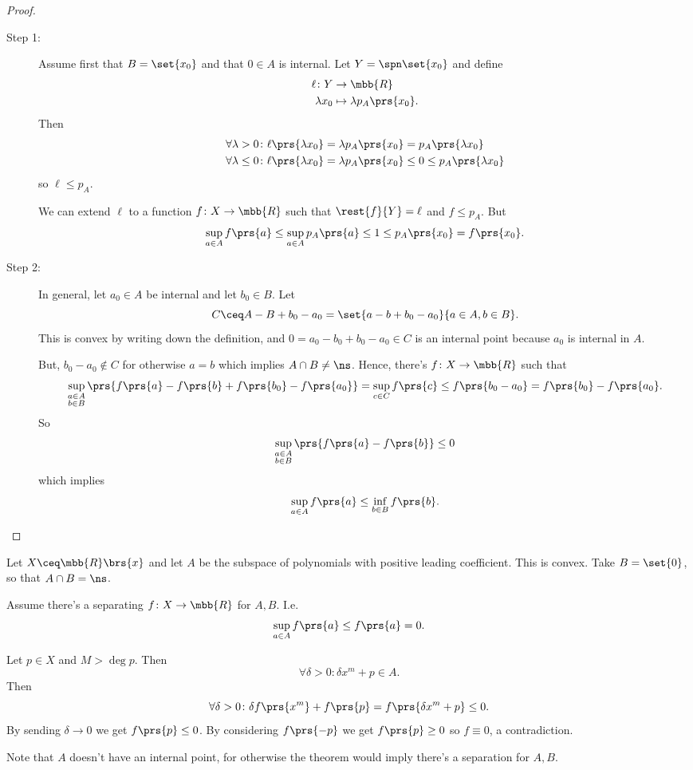 \documentclass[10pt, twoside]{book}
\begin{document}
\begin{proof}
\begin{description}
\item[Step 1:]
Assume first that $B = \set{x_0}$ and that $0 \in A$ is internal.
Let $Y = \spn\set{x_0}$ and define
\begin{align*}
\ell \colon Y &\to \mbb{R} \\
\lambda x_0 &\mapsto \lambda p_A\prs{x_0} \text{.}
\end{align*}
Then
\begin{align*}
\forall \lambda >0 \colon \ell\prs{\lambda x_0} &= \lambda p_A\prs{x_0} = p_A\prs{\lambda x_0} \\
\forall \lambda \leq 0 \colon \ell\prs{\lambda x_0} &= \lambda p_A\prs{x_0} \leq 0 \leq p_A\prs{\lambda x_0}
\end{align*}
so $\ell \leq p_A$.

We can extend $\ell$ to a function $f \colon X \to \mbb{R}$ such that $\rest{f}{Y} = \ell$ and $f \leq p_A$.
But
\[\sup_{a \in A} f\prs{a} \leq \sup_{a \in A} p_A\prs{a} \leq 1 \leq p_A\prs{x_0} = f\prs{x_0} \text{.}\]

\item[Step 2:]
In general, let $a_0 \in A$ be internal and let $b_0 \in B$. Let
\[C \ceq A - B + b_0 - a_0 = \set{a-b + b_0 - a_0}{a \in A, b \in B} \text{.}\]
This is convex by writing down the definition, and $0 = a_0 - b_0 + b_0 - a_0 \in C$ is an internal point because $a_0$ is internal in $A$.

But, $b_0 - a_0 \notin C$ for otherwise $a=b$ which implies $A \cap B \neq \ns$. Hence, there's $f \colon X \to \mbb{R}$ such that
\[\sup_{\substack{a \in A \\ b \in B}}\prs{f\prs{a} - f\prs{b} + f\prs{b_0} - f\prs{a_0}} = \sup_{c \in C} f\prs{c} \leq f\prs{b_0 - a_0} = f\prs{b_0} - f\prs{a_0}\text{.}\]
So
\[\sup_{\substack{a \in A \\ b \in B}} \prs{f\prs{a} - f\prs{b}} \leq 0\]
which implies
\[\sup_{a \in A} f\prs{a} \leq \inf_{b \in B} f\prs{b} \text{.}\] 
\end{description}
\end{proof}

\begin{example}
Let $X \ceq \mbb{R}\brs{x}$ and let $A$ be the subspace of polynomials with positive leading coefficient. This is convex. Take $B = \set{0}$, so that $A \cap B = \ns$.

Assume there's a separating $f \colon X \to \mbb{R}$ for $A,B$. I.e.
\[\sup_{a \in A} f\prs{a} \leq f\prs{a} = 0 \text{.}\]

Let $p \in X$ and $M > \deg p$. Then
\[\forall \delta >0 \colon \delta x^m + p \in A \text{.}\]
Then
\[\forall \delta > 0 \colon \delta f\prs{x^m} + f\prs{p} = f\prs{\delta x^m + p} \leq 0 \text{.}\]
By sending $\delta \to 0$ we get $f\prs{p} \leq 0$. By considering $f\prs{-p}$ we get $f\prs{p} \geq 0$ so $f \equiv 0$, a contradiction.

Note that $A$ doesn't have an internal point, for otherwise the theorem would imply there's a separation for $A,B$.
\end{example}
\end{document}
